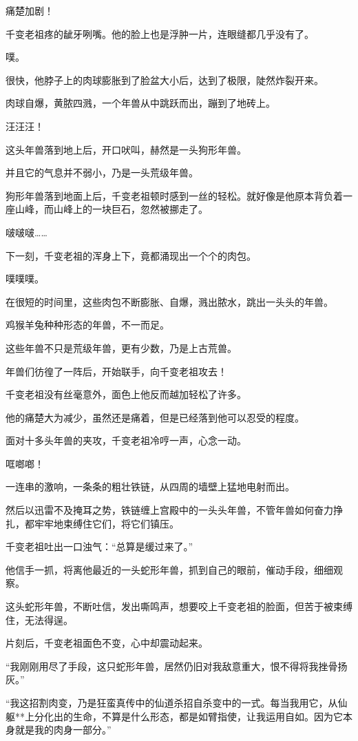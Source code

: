 \begin{this_body}
痛楚加剧！

千变老祖疼的龇牙咧嘴。他的脸上也是浮肿一片，连眼缝都几乎没有了。

噗。

很快，他脖子上的肉球膨胀到了脸盆大小后，达到了极限，陡然炸裂开来。

肉球自爆，黄脓四溅，一个年兽从中跳跃而出，蹦到了地砖上。

汪汪汪！

这头年兽落到地上后，开口吠叫，赫然是一头狗形年兽。

并且它的气息并不弱小，乃是一头荒级年兽。

狗形年兽落到地面上后，千变老祖顿时感到一丝的轻松。就好像是他原本背负着一座山峰，而山峰上的一块巨石，忽然被挪走了。

啵啵啵……

下一刻，千变老祖的浑身上下，竟都涌现出一个个的肉包。

噗噗噗。

在很短的时间里，这些肉包不断膨胀、自爆，溅出脓水，跳出一头头的年兽。

鸡猴羊兔种种形态的年兽，不一而足。

这些年兽不只是荒级年兽，更有少数，乃是上古荒兽。

年兽们彷徨了一阵后，开始联手，向千变老祖攻去！

千变老祖没有丝毫意外，面色上他反而越加轻松了许多。

他的痛楚大为减少，虽然还是痛着，但是已经落到他可以忍受的程度。

面对十多头年兽的夹攻，千变老祖冷哼一声，心念一动。

哐啷啷！

一连串的激响，一条条的粗壮铁链，从四周的墙壁上猛地电射而出。

然后以迅雷不及掩耳之势，铁链缠上宫殿中的一头头年兽，不管年兽如何奋力挣扎，都牢牢地束缚住它们，将它们镇压。

千变老祖吐出一口浊气：“总算是缓过来了。”

他信手一抓，将离他最近的一头蛇形年兽，抓到自己的眼前，催动手段，细细观察。

这头蛇形年兽，不断吐信，发出嘶鸣声，想要咬上千变老祖的脸面，但苦于被束缚住，无法得逞。

片刻后，千变老祖面色不变，心中却震动起来。

“我刚刚用尽了手段，这只蛇形年兽，居然仍旧对我敌意重大，恨不得将我挫骨扬灰。”

“我这招割肉变，乃是狂蛮真传中的仙道杀招自杀变中的一式。每当我用它，从仙躯**上分化出的生命，不算是什么形态，都是如臂指使，让我运用自如。因为它本身就是我的肉身一部分。”


\end{this_body}

